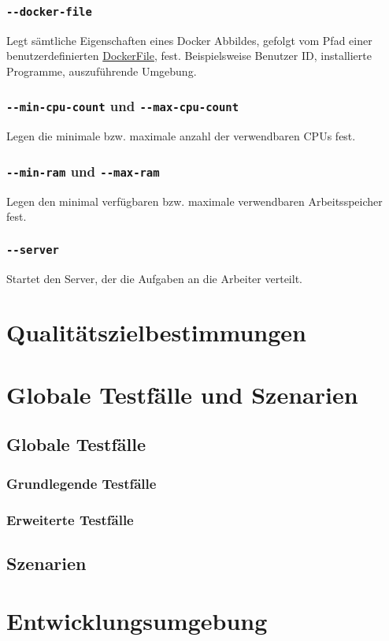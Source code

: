 \documentclass[a4paper,12pt]{article}
\begin{document}
\subsubsection{\texttt{-{}-docker-file}}
Legt sämtliche Eigenschaften eines Docker Abbildes, gefolgt vom Pfad einer benutzerdefinierten \href{https://docs.docker.com/engine/reference/builder/}{DockerFile}, fest.
Beispielsweise Benutzer ID, installierte Programme, auszuführende Umgebung.

\subsubsection{\texttt{-{}-min-cpu-count} und \texttt{-{}-max-cpu-count}}
Legen die minimale bzw. maximale anzahl der verwendbaren \glspl{CPU} fest.

\subsubsection{\texttt{-{}-min-ram} und \texttt{-{}-max-ram}}
Legen den minimal verfügbaren bzw. maximale verwendbaren Arbeitsspeicher fest.

\subsubsection{\texttt{-{}-server}}
Startet den Server, der die Aufgaben an die Arbeiter verteilt.

\section{Qualitätszielbestimmungen}

\section{Globale Testfälle und Szenarien}
\subsection{Globale Testfälle}
\subsubsection{Grundlegende Testfälle}
\subsubsection{Erweiterte Testfälle}
\subsection{Szenarien}
\section{Entwicklungsumgebung}

\clearpage
\printnoidxglossaries
\end{document}
